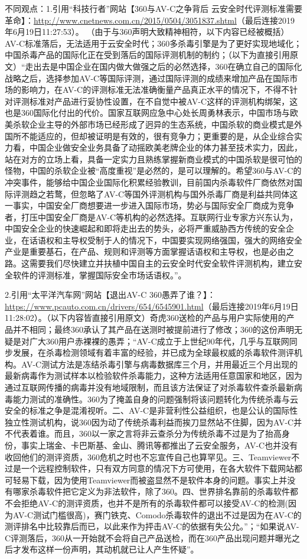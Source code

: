 不同观点：1.引用“科技行者”网站【360与AV-C之争背后 云安全时代评测标准需要革命】：\url{http://www.cnetnews.com.cn/2015/0504/3051837.shtml}（最后连接2019年6月19日11:27:53）。 （由于与360声明大致精神相符，以下内容已经被概括）AV-C标准落后，无法适用于云安全时代；360多杀毒引擎是为了更好实现地域化；中国杀毒产品的国际化正在受到落后的国际评测机制的制约；（以下为直接引用原文）“走出去是中国企业在国内做大做强之后的必然选择，360在确立自己的国际化战略之后，选择参加AV-C等国际评测，通过国际评测的成绩来增加产品在国际市场的影响力，在AV-C的评测标准无法准确衡量产品真正水平的情况下，不得不针对评测标准对产品进行妥协性设置，在不自觉中被AV-C这样的评测机构绑架，这也是360国际化付出的代价。国家互联网应急中心处长周勇林表示，中国市场与欧美杀软企业主导的外部市场已经形成了迥异的生态系统，中国杀软的商业模式是外国所不能适应的，但却被证明是有效的，很有竞争力；更重要的是，从企业综合实力看，中国企业做安全业务具备了动摇欧美老牌企业的体力甚至技术实力，因此，站在对方的立场上看，具备一定实力且熟练掌握新商业模式的中国杀软是很可怕的怪物，中国的杀软企业被“高度重视”是必然的，是可以理解的。希望360与AV-C的冲突事件，能够给中国企业国际化积累经验教训，目前国内杀毒软件厂商依然对国际评测趋之若鹜，但忽略了AV-C等国外评测机构与国外杀毒厂商是利益共同体这一事实，中国安全厂商想要进一步进入国际市场，势必与国际安全厂商成为竞争者，打压中国安全厂商是AV-C等机构的必然选择。互联网行业专家方兴东认为，中国安全企业的快速崛起和即将走出去的势头，必将严重威胁西方传统的安全企业，在话语权和主导权受制于人的情况下，中国要实现网络强国，强大的网络安全产业是重要基石，在产品、规则和评测等方面掌握话语权和主导权，也是必由之路。这需要我们尽快建立并扶植中国自主的云安全时代安全软件评测机构，建立安全软件的评测标准，掌握国际安全市场话语权。”。 \par 
2.引用“太平洋汽车网”网站【退出AV-C 360愚弄了谁？】：\url{https://www.pcauto.com.cn/drivers/654/6545901.html}（最后连接2019年6月19日11:28:02）。（以下内容皆直接引用原文）奇虎360送检的产品与用户实际使用的产品并不相同；最终360承认了其产品在送测时被提前进行了修改；360的这份声明无疑是对广大360用户赤裸裸的愚弄；“AV-C成立于上世纪90年代，几乎与互联网同步发展，在杀毒检测领域有着丰富的经验，并已成为全球最权威的杀毒软件测评机构。AV-C测试方法是冻结杀毒引擎与病毒数据库三个月，并用最近三个月出现的最新病毒作为测试样本以检验软件杀毒能力，这种方法适用任意国家和地区，因为通过互联网传播的病毒并没有地域限制，而且该方法保证了对杀毒软件查杀最新病毒能力测试的准确性。360为了掩盖自身的问题强制将该问题转化为传统杀毒与云安全的标准之争是混淆视听。二、AV-C是非营利性公益组织，也是公认的国际性独立性测试机构，说360因为动了传统杀毒利益而挨刀显然站不住脚，因为AV-C并不代表着谁。而且，360以一家之言将非云查杀分为传统杀毒不过是为了抬高身份，事实上瑞金、卡巴斯基、金山、腾讯等都推出了云安全服务，AV-C也并没有收回他们的测评资质，360危机之时也不忘宣传自己也算罕见。三、Teamviewer不过是一个远程控制软件，只有双方同意的情况下方可使用，在各大软件下载网站都可轻易下载，因为使用Teamviewer而被盗显然不是软件本身的问题。事实上并没有哪家杀毒软件把它定义为非法软件，除了360。四、世界排名靠前的杀毒软件都不会拒绝AV-C的测评资质，也并不是所有的杀毒软件都可以接受AV-C的检测(因为AV-C测试门槛很高)，赛门铁克、Comodo杀毒软件的退出不过是因为在AV-C的测评排名中比较靠后而已，以此来作为抨击AV-C的依据有失公允。”；“如果说AV-C评测落后，360从一开始就不会将自己产品送检，而在360产品出现问题并曝光之后才发布这样一份声明，其动机就已让人产生怀疑”。
